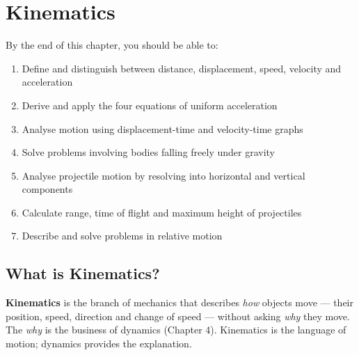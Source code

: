 %

\chapter{Kinematics}
\label{ch:kinematics}


\begin{objectivebox}
By the end of this chapter, you should be able to:
\begin{enumerate}[noitemsep]
  \item Define and distinguish between distance,
  displacement, speed, velocity and acceleration
  \item Derive and apply the four equations of uniform
  acceleration
  \item Analyse motion using displacement-time and
  velocity-time graphs
  \item Solve problems involving bodies falling freely
  under gravity
  \item Analyse projectile motion by resolving into
  horizontal and vertical components
  \item Calculate range, time of flight and maximum
  height of projectiles
  \item Describe and solve problems in relative motion
\end{enumerate}
\end{objectivebox}

\vspace{0.4cm}

\minitoc

\vspace{0.5cm}

\section{What is Kinematics?}

\textbf{Kinematics} is the branch of mechanics that
describes \textit{how} objects move --- their position,
speed, direction and change of speed --- without asking
\textit{why} they move. The \textit{why} is the business
of dynamics (Chapter 4). Kinematics is the language of
motion; dynamics provides the explanation.

